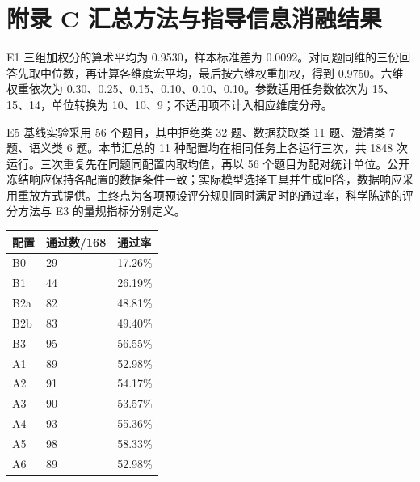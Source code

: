 \documentclass{dcfp}
\begin{document}
\section*{附录 C  汇总方法与指导信息消融结果}

E1 三组加权分的算术平均为 0.9530，样本标准差为 0.0092。对同题同维的三份回答先取中位数，再计算各维度宏平均，最后按六维权重加权，得到 0.9750。六维权重依次为 0.30、0.25、0.15、0.10、0.10、0.10。参数适用任务数依次为 15、15、14，单位转换为 10、10、9；不适用项不计入相应维度分母。

E5 基线实验采用 56 个题目，其中拒绝类 32 题、数据获取类 11 题、澄清类 7 题、语义类 6 题。本节汇总的 11 种配置均在相同任务上各运行三次，共 1848 次运行。三次重复先在同题同配置内取均值，再以 56 个题目为配对统计单位。公开冻结响应保持各配置的数据条件一致；实际模型选择工具并生成回答，数据响应采用重放方式提供。主终点为各项预设评分规则同时满足时的通过率，科学陈述的评分方法与 E3 的量规指标分别定义。

\par\noindent
\begin{minipage}[t]{0.96\linewidth}
\vspace{0pt}\captionsetup{type=table}
\fontsize{8.6bp}{11bp}\selectfont
\caption{E5 本文汇总配置的规则通过数\newline Table~\thetable\quad Rule-based pass counts for the reported E5 configurations}\label{layout-table-34}
\begin{tabularx}{\linewidth}{@{}lXX@{}}
\toprule
\textbf{配置} & \textbf{通过数/168} & \textbf{通过率} \\

\midrule
B0 & 29 & 17.26\% \\
B1 & 44 & 26.19\% \\
B2a & 82 & 48.81\% \\
B2b & 83 & 49.40\% \\
B3 & 95 & 56.55\% \\
A1 & 89 & 52.98\% \\
A2 & 91 & 54.17\% \\
A3 & 90 & 53.57\% \\
A4 & 93 & 55.36\% \\
A5 & 98 & 58.33\% \\
A6 & 89 & 52.98\% \\

\bottomrule
\end{tabularx}
\end{minipage}

\par\vspace{5bp}
\end{document}

